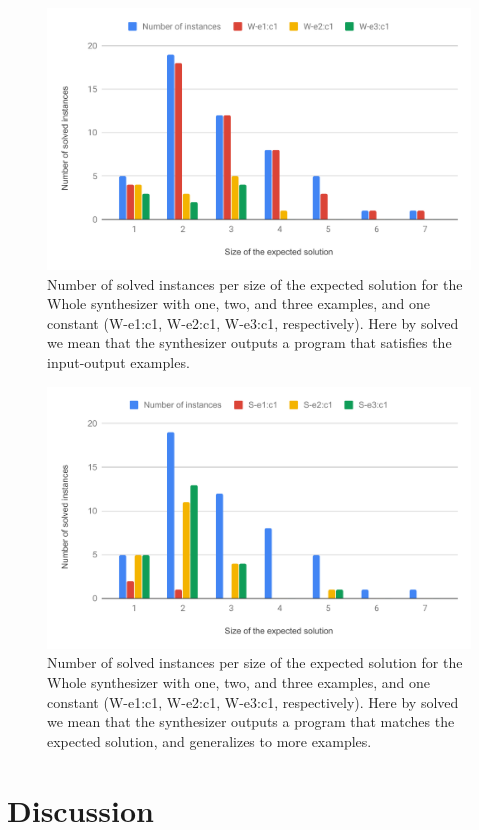 \begin{figure}
  \centering
  \includegraphics[width=1.0\textwidth]{assets/bar-chart-solved-whole.pdf}
  \caption{Number of solved instances per size of the expected solution for
    the Whole synthesizer with one, two, and three examples, and one constant
    (W-e1:c1, W-e2:c1, W-e3:c1, respectively).
    Here by solved we mean that the synthesizer outputs a program that satisfies the
    input-output examples.}
  \label{fig:bar-chart-solved-whole}
\end{figure}

\begin{figure}
  \centering
  \includegraphics[width=1.0\textwidth]{assets/bar-chart-expected-whole.pdf}
  \caption{Number of solved instances per size of the expected solution for
    the Whole synthesizer with one, two, and three examples, and one constant
    (W-e1:c1, W-e2:c1, W-e3:c1, respectively).
    Here by solved we mean that the synthesizer outputs a program that matches
    the expected solution, and generalizes to more examples.}
  \label{fig:bar-chart-expected-whole}
\end{figure}

\section{Discussion}
\label{sec:discussion}
